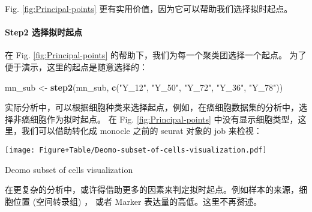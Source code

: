 \documentclass[
]{article}
\newenvironment{Shaded}{\begin{snugshade}}{\end{snugshade}}
\newcommand{\CommentTok}[1]{\textcolor[rgb]{0.56,0.35,0.01}{\textit{#1}}}
\newcommand{\KeywordTok}[1]{\textcolor[rgb]{0.13,0.29,0.53}{\textbf{#1}}}
\newcommand{\NormalTok}[1]{#1}
\newcommand{\OperatorTok}[1]{\textcolor[rgb]{0.81,0.36,0.00}{\textbf{#1}}}
\newcommand{\StringTok}[1]{\textcolor[rgb]{0.31,0.60,0.02}{#1}}
\begin{document}
Fig. \ref{fig:Principal-points} 更有实用价值，因为它可以帮助我们选择拟时起点。

\hypertarget{step2-ux9009ux62e9ux62dfux65f6ux8d77ux70b9}{%
\paragraph{Step2 选择拟时起点}\label{step2-ux9009ux62e9ux62dfux65f6ux8d77ux70b9}}

在 Fig. \ref{fig:Principal-points} 的帮助下，我们为每一个聚类团选择一个起点。
为了便于演示，这里的起点是随意选择的：

\begin{Shaded}
\begin{Highlighting}[]
\NormalTok{mn\_sub \textless{}{-}}\StringTok{ }\KeywordTok{step2}\NormalTok{(mn\_sub, }\KeywordTok{c}\NormalTok{(}\StringTok{"Y\_12"}\NormalTok{, }\StringTok{"Y\_50"}\NormalTok{, }\StringTok{"Y\_72"}\NormalTok{, }\StringTok{"Y\_36"}\NormalTok{, }\StringTok{"Y\_78"}\NormalTok{))}
\end{Highlighting}
\end{Shaded}

实际分析中，可以根据细胞种类来选择起点，例如，在癌细胞数据集的分析中，选择非癌细胞作为拟时起点。
在 Fig. \ref{fig:Principal-points} 中没有显示细胞类型，这里，我们可以借助转化成 monocle 之前的
seurat 对象的 job 来检视：

\begin{Shaded}
\end{Shaded}

\def\@captype{figure}
\begin{center}
\texttt{[image: Figure+Table/Deomo-subset-of-cells-visualization.pdf]}
\caption{Deomo subset of cells visualization}\label{fig:Deomo-subset-of-cells-visualization}
\end{center}

在更复杂的分析中，或许得借助更多的因素来判定拟时起点。例如样本的来源，细胞位置 (空间转录组) ，
或者 Marker 表达量的高低。这里不再赘述。
\end{document}
